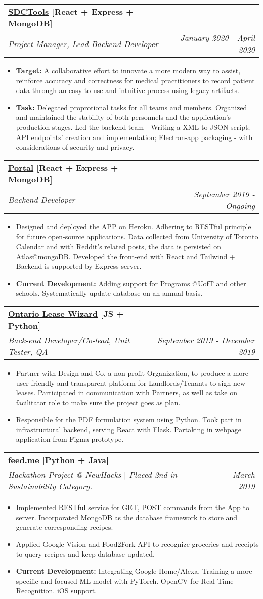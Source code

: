 \documentclass[letterpaper,4pt]{article}
\makeatletter
\newcommand{\resumeItem}[2]{
  \item\small{
    \textbf{#1}{#2 \vspace{-2pt}}
  }
}
\newcommand{\resumeSubheading}[4]{
  \vspace{-1pt}\item
    \begin{tabular*}{0.97\textwidth}{l@{\extracolsep{\fill}}r}
      \textbf{#1} & #2 \\
      \textit{\small#3} & \textit{\small #4} \\
    \end{tabular*}\vspace{-5pt}
}
\newcommand{\resumeItemListStart}{\begin{itemize}}
\newcommand{\resumeItemListEnd}{\end{itemize}\vspace{0pt}}
\makeatother
\begin{document}
  \resumeSubheading
  {\href{https://github.com/MaXeraph/proj-FakeBirds}{\underline{SDCTools}} [React + Express + MongoDB]}{}
  {Project Manager, Lead Backend Developer }{January 2020 - April 2020}
  \resumeItemListStart
    \resumeItem{Target: }
        {A collaborative effort to innovate a more modern way to assist, reinforce accuracy and correctness for medical practitioners to record patient data through an easy-to-use and intuitive process using legacy artifacts.}
    \resumeItem{Task: }
        {Delegated proprotional tasks for all teams and members. Organized and maintained the stability of both personnels and the application's production stages. Led the backend team - Writing a XML-to-JSON script; API endpoints' creation and implementation; Electron-app packaging - with considerations of security and privacy.}
  \resumeItemListEnd

  \resumeSubheading
  {\href{https://github.com/MaXeraph/Portal}{\underline{Portal}} [React + Express + MongoDB]}{}
  {Backend Developer}{September 2019 - Ongoing}
  \resumeItemListStart
    \resumeItem{}
        {Designed and deployed the APP on Heroku. Adhering to RESTful principle for future open-source applications. Data collected from University of Toronto \href{https://fas.calendar.utoronto.ca/}{\underline{Calendar}} and with Reddit's related posts, the data is persisted on Atlas@mongoDB. Developed the front-end with React and Tailwind + Backend is supported by Express server.}
    \resumeItem{Current Development: }
        {Adding support for Programs @UofT and other schools. Systematically update database on an annual basis.}
  \resumeItemListEnd

  \resumeSubheading
      {\href{https://lawdesigncolab.ca/redesign-ontario-standard-lease/}{\underline{Ontario Lease Wizard}} [JS + Python]}{}
      {Back-end Developer/Co-lead, Unit Tester, QA}{September 2019 - December 2019}
    \resumeItemListStart
      \resumeItem{}
          {Partner with Design and Co, a non-profit Organization, to produce a more user-friendly and transparent platform for Landlords/Tenants to sign new leases. Participated in communication with Partners, as well as take on facilitator role to make sure the project goes as plan.}
      \resumeItem{}
          {Responsible for the PDF formulation system using Python. Took part in infrastructural backend, serving React with Flask.  Partaking in webpage application from Figma prototype.}
    \resumeItemListEnd


    \resumeSubheading
      {\href{https://feedme.maxpham.dev/}{\underline{feed.me}} [Python + Java]}{}
      {Hackathon Project @ NewHacks $|$ Placed 2nd in Sustainability Category.}{March 2019}
      \resumeItemListStart
        \resumeItem{}
            {Implemented RESTful service for GET, POST commands from the App to server. Incorporated MongoDB as the database framework to store and generate corresponding recipes.}
        \resumeItem{}
            {Applied Google Vision and Food2Fork API to recognize groceries and receipts to query recipes and keep database updated.}
        \resumeItem{Current Development: }
            {Integrating Google Home/Alexa. Training a more specific and focused ML model with PyTorch. OpenCV for Real-Time Recognition. iOS support.}
      \resumeItemListEnd
\end{document}
